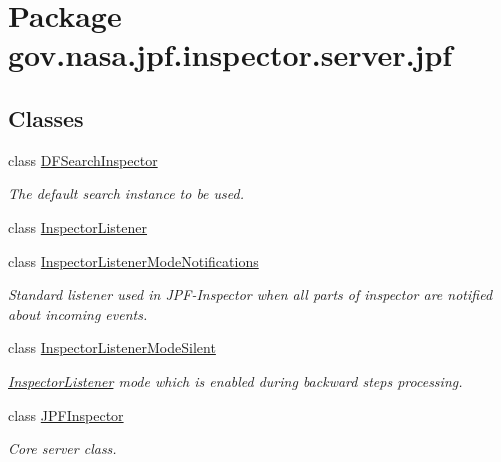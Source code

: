 \hypertarget{namespacegov_1_1nasa_1_1jpf_1_1inspector_1_1server_1_1jpf}{}\section{Package gov.\+nasa.\+jpf.\+inspector.\+server.\+jpf}
\label{namespacegov_1_1nasa_1_1jpf_1_1inspector_1_1server_1_1jpf}
\subsection*{Classes}
\begin{DoxyCompactItemize}
\item 
class \hyperlink{classgov_1_1nasa_1_1jpf_1_1inspector_1_1server_1_1jpf_1_1_d_f_search_inspector}{D\+F\+Search\+Inspector}
\begin{DoxyCompactList}\small\item\em The default search instance to be used. \end{DoxyCompactList}\item 
class \hyperlink{classgov_1_1nasa_1_1jpf_1_1inspector_1_1server_1_1jpf_1_1_inspector_listener}{Inspector\+Listener}
\item 
class \hyperlink{classgov_1_1nasa_1_1jpf_1_1inspector_1_1server_1_1jpf_1_1_inspector_listener_mode_notifications}{Inspector\+Listener\+Mode\+Notifications}
\begin{DoxyCompactList}\small\item\em Standard listener used in J\+P\+F-\/\+Inspector when all parts of inspector are notified about incoming events. \end{DoxyCompactList}\item 
class \hyperlink{classgov_1_1nasa_1_1jpf_1_1inspector_1_1server_1_1jpf_1_1_inspector_listener_mode_silent}{Inspector\+Listener\+Mode\+Silent}
\begin{DoxyCompactList}\small\item\em \hyperlink{classgov_1_1nasa_1_1jpf_1_1inspector_1_1server_1_1jpf_1_1_inspector_listener}{Inspector\+Listener} mode which is enabled during backward steps processing. \end{DoxyCompactList}\item 
class \hyperlink{classgov_1_1nasa_1_1jpf_1_1inspector_1_1server_1_1jpf_1_1_j_p_f_inspector}{J\+P\+F\+Inspector}
\begin{DoxyCompactList}\small\item\em Core server class. \end{DoxyCompactList}\item 

\end{DoxyCompactItemize}
